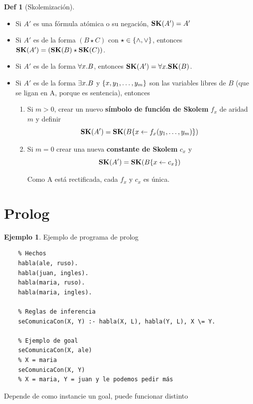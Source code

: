 \documentclass{report}
\theoremstyle{definition} %
\newtheorem*{definition*}{Def}
\newtheorem*{example*}{Ejemplo}
\newcommand{\sustOne}[3]{#1 \{ #2 \leftarrow #3 \}}
\begin{document}
\begin{definition*}[Skolemización]
    \begin{itemize}
        \item Si $A'$ es una fórmula atómica o su negación, $\text{\textbf{SK}}(A') = A'$
        \item Si $A'$ es de la forma $(B \star C)$ con $\star \in \{ \wedge,
        \vee \}$, entonces $\text{\textbf{SK}}(A') = (\text{\textbf{SK}}(B) \star \text{\textbf{SK}}(C))$.
        \item Si $A'$ es de la forma $\forall x . B$, entonces $\text{\textbf{SK}}(A') = \forall x . \text{\textbf{SK}}(B)$.
        \item Si $A'$ es de la forma $\exists x . B$ y $\{ x, y_1, \dots,
        y_m \}$  son las variables libres de $B$ (que se ligan en A, porque es
        sentencia), entonces
        \begin{enumerate}
            \item Si $m > 0$, crear un nuevo \textbf{símbolo de función de
            Skolem} $f_x$ de aridad $m$ y definir
            \[
                \sk{A'} = \sk{\sustOne{B}{x}{f_x(y_1, \dots, y_m)}}
            \]
            \item Si $m = 0$ crear una nueva \textbf{constante de Skolem} $c_x$
            y
            \[
                \sk{A'} = \sk{\sustOne{B}{x}{c_x}}
            \]

            Como A está rectificada, cada $f_x$ y $c_x$ es única.
        \end{enumerate}
    \end{itemize}
\end{definition*}
\section{Prolog}

\begin{example*} Ejemplo de programa de prolog
    \begin{verbatim}
    % Hechos
    habla(ale, ruso).
    habla(juan, ingles).
    habla(maria, ruso).
    habla(maria, ingles).

    % Reglas de inferencia
    seComunicaCon(X, Y) :- habla(X, L), habla(Y, L), X \= Y.

    % Ejemplo de goal
    seComunicaCon(X, ale)
    % X = maria
    seComunicaCon(X, Y)
    % X = maria, Y = juan y le podemos pedir más
    \end{verbatim}

    Depende de como instancie un goal, puede funcionar distinto

\end{example*}
\end{document}

